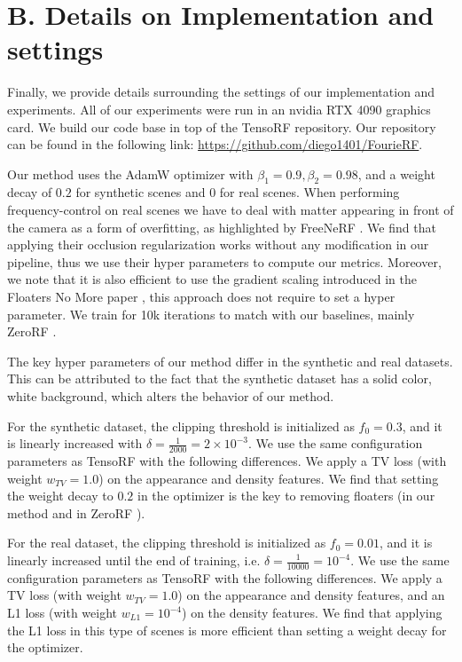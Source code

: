 \section*{B. Details on Implementation and settings}

Finally, we provide details surrounding the settings of our implementation and experiments. All of our experiments were run in an nvidia RTX 4090 graphics card.
We build our code base in top of the TensoRF \cite{Chen2022ECCV} repository. Our repository can be found in the following link: \url{https://github.com/diego1401/FourieRF}.

Our method uses the AdamW optimizer \cite{kingma2014adam,loshchilov2017decoupled} with $\beta_1  = 0.9, \beta_2= 0.98$, and a weight decay of $0.2$ for synthetic scenes and $0$ for real scenes. When performing frequency-control on real scenes we have to deal with matter appearing in front of the camera as a form of overfitting, as highlighted by FreeNeRF \cite{yang2023freenerf}. We find that applying their occlusion regularization works without any modification in our pipeline, thus we use their hyper parameters to compute our metrics. Moreover, we note that it is also efficient to use the gradient scaling introduced in the Floaters No More paper \cite{philip2023floaters}, this approach does not require to set a hyper parameter. We train for 10k iterations to match with our baselines, mainly ZeroRF \cite{shi2024zerorf}.

The key hyper parameters of our method differ in the synthetic and real datasets. 
This can be attributed to the fact that the synthetic dataset has a solid color, white background, which alters the behavior of our method.

For the synthetic dataset, the clipping threshold is initialized as $f_0=0.3$, and it is linearly increased with $\delta = \frac{1}{2 000}= 2\times10^{-3}$. We use the same configuration parameters as TensoRF \cite{Chen2022ECCV} with the following differences. We apply a TV loss (with weight $w_{TV} = 1.0$) on the appearance and density features. We find that setting the weight decay to $0.2$ in the optimizer is the key to removing floaters (in our method and in ZeroRF \cite{shi2024zerorf}).

For the real dataset, the clipping threshold is initialized as $f_0=0.01$, and it is linearly increased until the end of training, i.e. $\delta = \frac{1}{10 000}= 10^{-4}$. We use the same configuration parameters as TensoRF \cite{Chen2022ECCV} with the following differences. We apply a TV loss (with weight $w_{TV} = 1.0$) on the appearance and density features, and an L1 loss (with weight $w_{L1} = 10^{-4}$) on the density features. We find that applying the L1 loss in this type of scenes is more efficient than setting a weight decay for the optimizer.